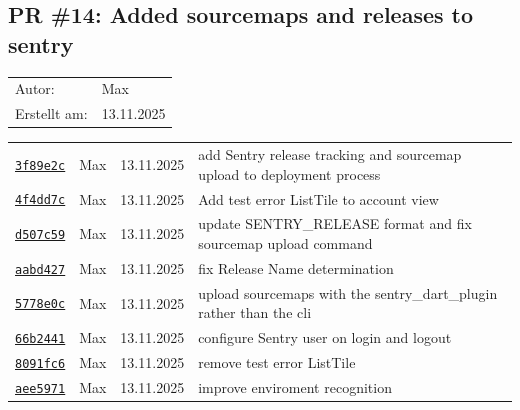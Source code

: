 \documentclass{article}%
\begin{document}
%
\subsection{PR \#14: Added sourcemaps and releases to sentry}%
\label{pr:14}%
\begin{tabular}{l l}%
Autor:&Max\\%
Erstellt am: &13.11.2025\\%
\end{tabular}%
\begin{longtable}{l l l p{12cm}}%
\href{https://github.com/scriptor1000/homeworks/pull/14/commits/3f89e2cc8f4c196bdba945aad4f0b752a58af268}{\underline{\texttt{3f89e2c}}}&Max&13.11.2025& add Sentry release tracking and sourcemap upload to deployment process\\%
\href{https://github.com/scriptor1000/homeworks/pull/14/commits/4f4dd7c0a4c7b8ff34b3ffe4fb74099847772f4e}{\underline{\texttt{4f4dd7c}}}&Max&13.11.2025&Add test error ListTile to account view\\%
\href{https://github.com/scriptor1000/homeworks/pull/14/commits/d507c59d57496baea46de1cf8434867284155ed8}{\underline{\texttt{d507c59}}}&Max&13.11.2025&update SENTRY\_RELEASE format and fix sourcemap upload command\\%
\href{https://github.com/scriptor1000/homeworks/pull/14/commits/aabd427fffacbf8d22b6a25cd7110e76c1c57187}{\underline{\texttt{aabd427}}}&Max&13.11.2025&fix Release Name determination\\%
\href{https://github.com/scriptor1000/homeworks/pull/14/commits/5778e0c45d57af2ee6888437e2e5d9323f54774c}{\underline{\texttt{5778e0c}}}&Max&13.11.2025&upload sourcemaps with the sentry\_dart\_plugin rather than the cli\\%
\href{https://github.com/scriptor1000/homeworks/pull/14/commits/66b2441ef1a7f066fde7edf355ce135893a63a68}{\underline{\texttt{66b2441}}}&Max&13.11.2025&configure Sentry user on login and logout\\%
\href{https://github.com/scriptor1000/homeworks/pull/14/commits/8091fc64871a1c221be31a2a35e930dde6f0a101}{\underline{\texttt{8091fc6}}}&Max&13.11.2025&remove test error ListTile\\%
\href{https://github.com/scriptor1000/homeworks/pull/14/commits/aee5971a6f640b2ef9053855c0a6c57ed76c5e54}{\underline{\texttt{aee5971}}}&Max&13.11.2025&improve enviroment recognition\\%
\end{longtable}

%
\end{document}
